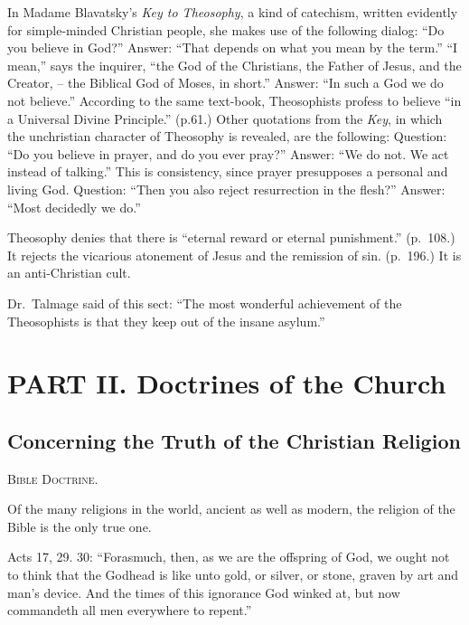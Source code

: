 \documentclass[
]{book}
\begin{document}
In Madame Blavatsky's \emph{Key to Theosophy}, a kind of catechism, written evidently for simple-minded Christian people, she makes use of the following dialog: ``Do you believe in God?'' Answer: ``That depends on what you mean by the term.'' ``I mean,'' says the inquirer, ``the God of the Christians, the Father of Jesus, and the Creator, -- the Biblical God of Moses, in short.'' Answer: ``In such a God we do not believe.'' According to the same text-book, Theosophists profess to believe ``in a Universal Divine Principle.'' (p.61.) Other quotations from the \emph{Key}, in which the unchristian character of Theosophy is revealed, are the following: Question: ``Do you believe in prayer, and do you ever pray?'' Answer: ``We do not. We act instead of talking.'' This is consistency, since prayer presupposes a personal and living God. Question: ``Then you also reject resurrection in the flesh?'' Answer: ``Most decidedly we do.''

Theosophy denies that there is ``eternal reward or eternal punishment.'' (p.~108.) It rejects the vicarious atonement of Jesus and the remission of sin. (p.~196.) It is an anti-Christian cult.

Dr.~Talmage said of this sect: ``The most wonderful achievement of the Theosophists is that they keep out of the insane asylum.''

\chapter*{PART II. Doctrines of the Church}\label{part-ii.-doctrines-of-the-church}

\section{Concerning the Truth of the Christian Religion}\label{concerning-the-truth-of-the-christian-religion}

\begin{center}
\textsc{Bible Doctrine.}
\end{center}

Of the many religions in the world, ancient as well as modern, the religion of the Bible is the only true one.

Acts 17, 29. 30: ``Forasmuch, then, as we are the offspring of God, we ought not to think that the Godhead is like unto gold, or silver, or stone, graven by art and man's device. And the times of this ignorance God winked at, but now commandeth all men everywhere to repent.''
\end{document}
